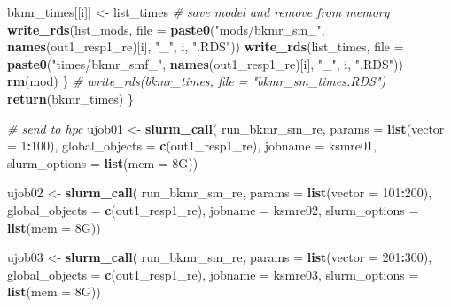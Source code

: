 \documentclass[12pt, twoside]{amherstthesis}
\newenvironment{Shaded}{\begin{snugshade}}{\end{snugshade}}
\newcommand{\AttributeTok}[1]{\textcolor[rgb]{0.13,0.29,0.53}{#1}}
\newcommand{\CommentTok}[1]{\textcolor[rgb]{0.56,0.35,0.01}{\textit{#1}}}
\newcommand{\DecValTok}[1]{\textcolor[rgb]{0.00,0.00,0.81}{#1}}
\newcommand{\FunctionTok}[1]{\textcolor[rgb]{0.13,0.29,0.53}{\textbf{#1}}}
\newcommand{\NormalTok}[1]{#1}
\newcommand{\OtherTok}[1]{\textcolor[rgb]{0.56,0.35,0.01}{#1}}
\newcommand{\SpecialCharTok}[1]{\textcolor[rgb]{0.81,0.36,0.00}{\textbf{#1}}}
\newcommand{\StringTok}[1]{\textcolor[rgb]{0.31,0.60,0.02}{#1}}
\begin{document}
\begin{Shaded}
\begin{Highlighting}[]
    
\NormalTok{    bkmr\_times[[i]] }\OtherTok{\textless{}{-}}\NormalTok{ list\_times}
    \CommentTok{\# save model and remove from memory}
    \FunctionTok{write\_rds}\NormalTok{(list\_mods, }\AttributeTok{file =} 
                \FunctionTok{paste0}\NormalTok{(}\StringTok{"mods/bkmr\_sm\_"}\NormalTok{, }\FunctionTok{names}\NormalTok{(out1\_resp1\_re)[i], }\StringTok{"\_"}\NormalTok{, i, }\StringTok{".RDS"}\NormalTok{))}
    \FunctionTok{write\_rds}\NormalTok{(list\_times, }\AttributeTok{file =} 
                \FunctionTok{paste0}\NormalTok{(}\StringTok{"times/bkmr\_smf\_"}\NormalTok{, }\FunctionTok{names}\NormalTok{(out1\_resp1\_re)[i], }\StringTok{"\_"}\NormalTok{, i, }\StringTok{".RDS"}\NormalTok{))}
    \FunctionTok{rm}\NormalTok{(mod)}
\NormalTok{  \}}
  \CommentTok{\# write\_rds(bkmr\_times, file = "bkmr\_sm\_times.RDS")}
  \FunctionTok{return}\NormalTok{(bkmr\_times)}
\NormalTok{\}}

\CommentTok{\# send to hpc}
\NormalTok{ujob01 }\OtherTok{\textless{}{-}} \FunctionTok{slurm\_call}\NormalTok{(}
\NormalTok{  run\_bkmr\_sm\_re, }\AttributeTok{params =} \FunctionTok{list}\NormalTok{(}\AttributeTok{vector =} \DecValTok{1}\SpecialCharTok{:}\DecValTok{100}\NormalTok{),}
  \AttributeTok{global\_objects =} \FunctionTok{c}\NormalTok{(}\StringTok{\textquotesingle{}out1\_resp1\_re\textquotesingle{}}\NormalTok{),}
  \AttributeTok{jobname =} \StringTok{\textquotesingle{}ksmre01\textquotesingle{}}\NormalTok{,}
  \AttributeTok{slurm\_options =} \FunctionTok{list}\NormalTok{(}\AttributeTok{mem =} \StringTok{\textquotesingle{}8G\textquotesingle{}}\NormalTok{))}

\NormalTok{ujob02 }\OtherTok{\textless{}{-}} \FunctionTok{slurm\_call}\NormalTok{(}
\NormalTok{  run\_bkmr\_sm\_re, }\AttributeTok{params =} \FunctionTok{list}\NormalTok{(}\AttributeTok{vector =} \DecValTok{101}\SpecialCharTok{:}\DecValTok{200}\NormalTok{),}
  \AttributeTok{global\_objects =} \FunctionTok{c}\NormalTok{(}\StringTok{\textquotesingle{}out1\_resp1\_re\textquotesingle{}}\NormalTok{),}
  \AttributeTok{jobname =} \StringTok{\textquotesingle{}ksmre02\textquotesingle{}}\NormalTok{,}
  \AttributeTok{slurm\_options =} \FunctionTok{list}\NormalTok{(}\AttributeTok{mem =} \StringTok{\textquotesingle{}8G\textquotesingle{}}\NormalTok{))}

\NormalTok{ujob03 }\OtherTok{\textless{}{-}} \FunctionTok{slurm\_call}\NormalTok{(}
\NormalTok{  run\_bkmr\_sm\_re, }\AttributeTok{params =} \FunctionTok{list}\NormalTok{(}\AttributeTok{vector =} \DecValTok{201}\SpecialCharTok{:}\DecValTok{300}\NormalTok{),}
  \AttributeTok{global\_objects =} \FunctionTok{c}\NormalTok{(}\StringTok{\textquotesingle{}out1\_resp1\_re\textquotesingle{}}\NormalTok{),}
  \AttributeTok{jobname =} \StringTok{\textquotesingle{}ksmre03\textquotesingle{}}\NormalTok{,}
  \AttributeTok{slurm\_options =} \FunctionTok{list}\NormalTok{(}\AttributeTok{mem =} \StringTok{\textquotesingle{}8G\textquotesingle{}}\NormalTok{))}


\end{Highlighting}
\end{Shaded}
\end{document}
